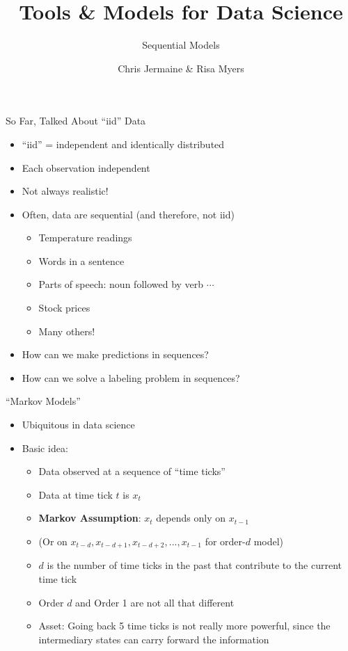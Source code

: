\documentclass[aspectratio=169]{beamer}
\title[]
{Tools \& Models for Data Science}
\subtitle{Sequential Models}
\author[]{Chris Jermaine \& Risa Myers}
\institute
{
  Rice University 
}
\date[]{}
\begin{document}
\begin{frame}
 \titlepage
\end{frame}
\begin{frame}{So Far, Talked About ``iid'' Data}

\begin{itemize}
	\item ``iid'' = independent and identically distributed
	\item Each observation independent
        \item Not always realistic!
	\item Often, data are sequential  (and therefore, not iid)
        \begin{itemize}
		\item Temperature readings
		\item Words in a sentence
		\item Parts of speech: noun followed by verb $\cdots$
		\item Stock prices
		\item Many others!
        \end{itemize}
	\item How can we make predictions in sequences?
	\item How can we solve a labeling problem in sequences?
\end{itemize}
\end{frame}
\begin{frame}{``Markov Models''}

\begin{itemize}
	\item Ubiquitous in data science
	\item Basic idea:
	\begin{itemize}
		\item Data observed at a sequence of ``time ticks''
		\item Data at time tick $t$ is $x_t$
		\item \textbf{Markov Assumption}: $x_t$ depends only on $x_{t-1}$
		\item (Or on $x_{t-d}, x_{t-d+1}, x_{t-d+2}, ..., x_{t-1}$ for order-$d$ model)
		\item $d$ is the number of time ticks in the past that contribute to the current time tick
		\item Order $d$ and Order 1 are not all that different
		\item Asset: Going back 5 time ticks is not really more powerful, since the intermediary states can carry forward the information
	\end{itemize}
\end{itemize}
\end{frame}
\end{document}

